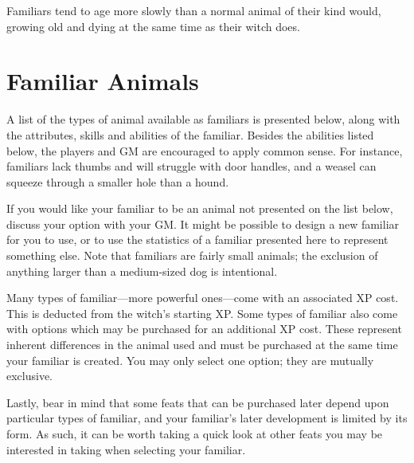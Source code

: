 Familiars tend to age more slowly than a normal animal of their kind would, growing old and dying at the same time as their witch does.

\section{Familiar Animals}

A list of the types of animal available as familiars is presented below, along with the attributes, skills and abilities of the familiar.
Besides the abilities listed below, the players and GM are encouraged to apply common sense.
For instance, familiars lack thumbs and will struggle with door handles, and a weasel can squeeze through a smaller hole than a hound.

If you would like your familiar to be an animal not presented on the list below, discuss your option with your GM.
It might be possible to design a new familiar for you to use, or to use the statistics of a familiar presented here to represent something else.
Note that familiars are fairly small animals; the exclusion of anything larger than a medium-sized dog is intentional.

Many types of familiar---more powerful ones---come with an associated XP cost.
This is deducted from the witch's starting XP.
Some types of familiar also come with options which may be purchased for an additional XP cost.
These represent inherent differences in the animal used and must be purchased at the same time your familiar is created.
You may only select one option; they are mutually exclusive.

Lastly, bear in mind that some feats that can be purchased later depend upon particular types of familiar, and your familiar's later development is limited by its form.
As such, it can be worth taking a quick look at other feats you may be interested in taking when selecting your familiar.



